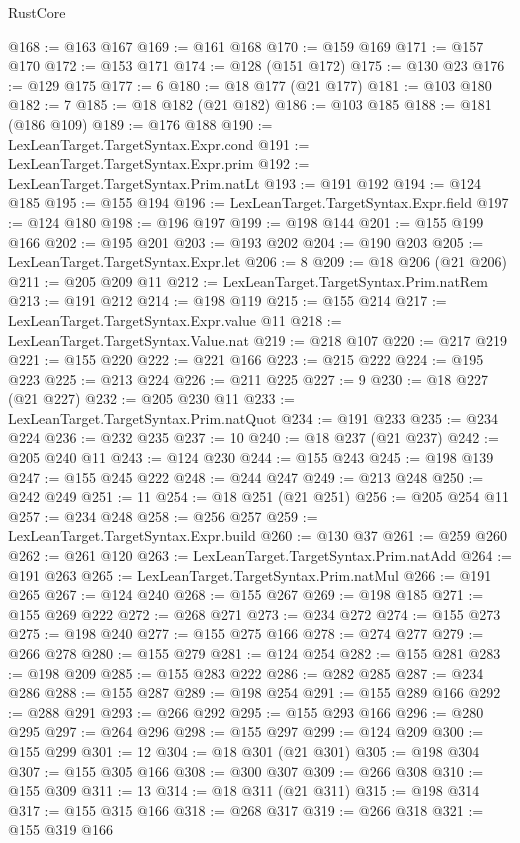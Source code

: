 \begin{lexlean}{RustCore}
\begin{coremodule}
@168 := @163 @167
@169 := @161 @168
@170 := @159 @169
@171 := @157 @170
@172 := @153 @171
@174 := @128 (@151 @172)
@175 := @130 @23
@176 := @129 @175
@177 := 6
@180 := @18 @177 (@21 @177)
@181 := @103 @180
@182 := 7
@185 := @18 @182 (@21 @182)
@186 := @103 @185
@188 := @181 (@186 @109)
@189 := @176 @188
@190 := LexLeanTarget.TargetSyntax.Expr.cond
@191 := LexLeanTarget.TargetSyntax.Expr.prim
@192 := LexLeanTarget.TargetSyntax.Prim.natLt
@193 := @191 @192
@194 := @124 @185
@195 := @155 @194
@196 := LexLeanTarget.TargetSyntax.Expr.field
@197 := @124 @180
@198 := @196 @197
@199 := @198 @144
@201 := @155 @199 @166
@202 := @195 @201
@203 := @193 @202
@204 := @190 @203
@205 := LexLeanTarget.TargetSyntax.Expr.let
@206 := 8
@209 := @18 @206 (@21 @206)
@211 := @205 @209 @11
@212 := LexLeanTarget.TargetSyntax.Prim.natRem
@213 := @191 @212
@214 := @198 @119
@215 := @155 @214
@217 := LexLeanTarget.TargetSyntax.Expr.value @11
@218 := LexLeanTarget.TargetSyntax.Value.nat
@219 := @218 @107
@220 := @217 @219
@221 := @155 @220
@222 := @221 @166
@223 := @215 @222
@224 := @195 @223
@225 := @213 @224
@226 := @211 @225
@227 := 9
@230 := @18 @227 (@21 @227)
@232 := @205 @230 @11
@233 := LexLeanTarget.TargetSyntax.Prim.natQuot
@234 := @191 @233
@235 := @234 @224
@236 := @232 @235
@237 := 10
@240 := @18 @237 (@21 @237)
@242 := @205 @240 @11
@243 := @124 @230
@244 := @155 @243
@245 := @198 @139
@247 := @155 @245 @222
@248 := @244 @247
@249 := @213 @248
@250 := @242 @249
@251 := 11
@254 := @18 @251 (@21 @251)
@256 := @205 @254 @11
@257 := @234 @248
@258 := @256 @257
@259 := LexLeanTarget.TargetSyntax.Expr.build
@260 := @130 @37
@261 := @259 @260
@262 := @261 @120
@263 := LexLeanTarget.TargetSyntax.Prim.natAdd
@264 := @191 @263
@265 := LexLeanTarget.TargetSyntax.Prim.natMul
@266 := @191 @265
@267 := @124 @240
@268 := @155 @267
@269 := @198 @185
@271 := @155 @269 @222
@272 := @268 @271
@273 := @234 @272
@274 := @155 @273
@275 := @198 @240
@277 := @155 @275 @166
@278 := @274 @277
@279 := @266 @278
@280 := @155 @279
@281 := @124 @254
@282 := @155 @281
@283 := @198 @209
@285 := @155 @283 @222
@286 := @282 @285
@287 := @234 @286
@288 := @155 @287
@289 := @198 @254
@291 := @155 @289 @166
@292 := @288 @291
@293 := @266 @292
@295 := @155 @293 @166
@296 := @280 @295
@297 := @264 @296
@298 := @155 @297
@299 := @124 @209
@300 := @155 @299
@301 := 12
@304 := @18 @301 (@21 @301)
@305 := @198 @304
@307 := @155 @305 @166
@308 := @300 @307
@309 := @266 @308
@310 := @155 @309
@311 := 13
@314 := @18 @311 (@21 @311)
@315 := @198 @314
@317 := @155 @315 @166
@318 := @268 @317
@319 := @266 @318
@321 := @155 @319 @166

\end{coremodule}
\end{lexlean}
